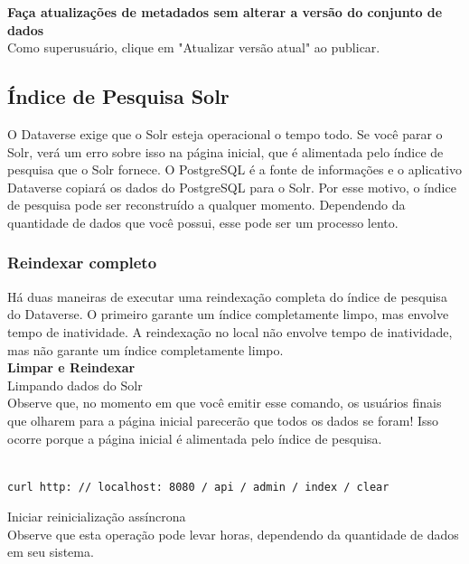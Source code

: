 \documentclass[12pt,hidelinks]{article}
\begin{document}
\textbf{Faça atualizações de metadados sem alterar a versão do conjunto de dados}\\

Como superusuário, clique em "Atualizar versão atual" ao publicar.

\subsection{Índice de Pesquisa Solr}

\qquad O Dataverse exige que o Solr esteja operacional o tempo todo. Se você parar o Solr, verá um erro sobre isso na página inicial, que é alimentada pelo índice de pesquisa que o Solr fornece. O PostgreSQL é a fonte de informações e o aplicativo Dataverse copiará os dados do PostgreSQL para o Solr. Por esse motivo, o índice de pesquisa pode ser reconstruído a qualquer momento. Dependendo da quantidade de dados que você possui, esse pode ser um processo lento.

\subsubsection{Reindexar completo}

\qquad Há duas maneiras de executar uma reindexação completa do índice de pesquisa do Dataverse. O primeiro garante um índice completamente limpo, mas envolve tempo de inatividade. A reindexação no local não envolve tempo de inatividade, mas não garante um índice completamente limpo.\\

\textbf{Limpar e Reindexar}\\

Limpando dados do Solr\\

Observe que, no momento em que você emitir esse comando, os usuários finais que olharem para a página inicial parecerão que todos os dados se foram! Isso ocorre porque a página inicial é alimentada pelo índice de pesquisa.

\begin{verbatim}

curl http: // localhost: 8080 / api / admin / index / clear

\end{verbatim}

Iniciar reinicialização assíncrona\\

Observe que esta operação pode levar horas, dependendo da quantidade de dados em seu sistema.
\end{document}
